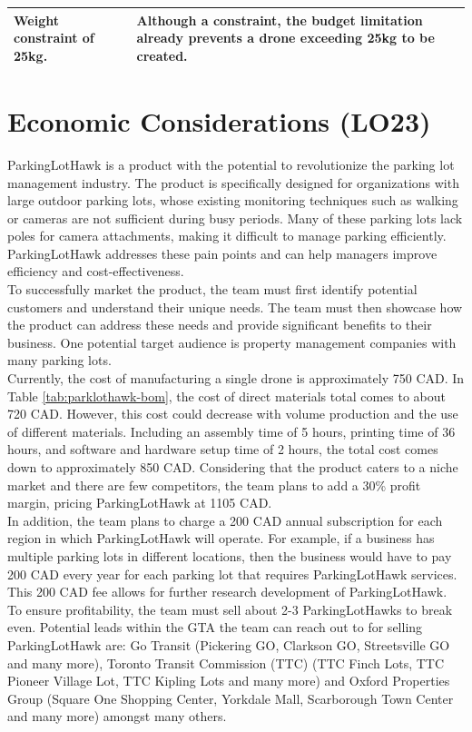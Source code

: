 \documentclass{article}
\begin{document}
\begin{table}[!h]
\begin{center}
\begin{tabular}{ | m{4.7cm} | m{10.7cm} | }
\hline
Weight constraint of 25kg. &
    Although a constraint, the budget limitation already prevents a drone exceeding 25kg to be created. \\
\hline
\end{tabular}
\end{center}
\end{table}
 

\newpage

\section{Economic Considerations (LO23)}

\indent ParkingLotHawk is a product with the potential to revolutionize the parking lot management industry. The product is specifically designed for organizations with large outdoor parking lots, whose existing monitoring techniques such as walking or cameras are not sufficient during busy periods. Many of these parking lots lack poles for camera attachments, making it difficult to manage parking efficiently. ParkingLotHawk addresses these pain points and can help managers improve efficiency and cost-effectiveness.\\
\indent To successfully market the product, the team must first identify potential customers and understand their unique needs. The team must then showcase how the product can address these needs and provide significant benefits to their business. One potential target audience is property management companies with many parking lots.\\
\indent Currently, the cost of manufacturing a single drone is approximately 750 CAD. In Table \ref{tab:parklothawk-bom}, the cost of direct materials total comes to about 720 CAD. However, this cost could decrease with volume production and the use of different materials. Including an assembly time of 5 hours, printing time of 36 hours, and software and hardware setup time of 2 hours, the total cost comes down to approximately 850 CAD. Considering that the product caters to a niche market and there are few competitors, the team plans to add a 30\% profit margin, pricing ParkingLotHawk at 1105 CAD.\\
\indent In addition, the team plans to charge a 200 CAD annual subscription for each region in which ParkingLotHawk will operate. For example, if a business has multiple parking lots in different locations, then the business would have to pay 200 CAD every year for each parking lot that requires ParkingLotHawk services. This 200 CAD fee allows for further research development of ParkingLotHawk. To ensure profitability, the team must sell about 2-3 ParkingLotHawks to break even. Potential leads within the GTA the team can reach out to for selling ParkingLotHawk are: Go Transit (Pickering GO, Clarkson GO, Streetsville GO and many more), Toronto Transit Commission (TTC) (TTC Finch Lots, TTC Pioneer Village Lot, TTC Kipling Lots and many more) and Oxford Properties Group (Square One Shopping Center, Yorkdale Mall, Scarborough Town Center and many more) amongst many others.
\end{document}
